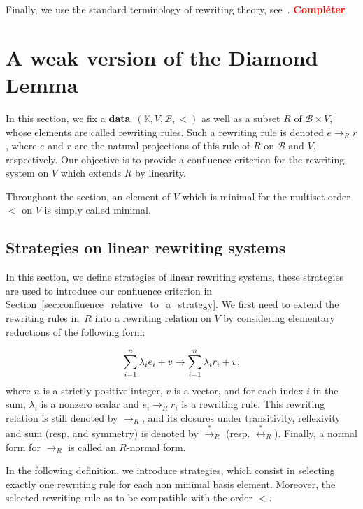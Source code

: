 \documentclass[10pt]{easychair}
\theoremstyle{definition}
\newcommand\todo[1]{{\bf\textcolor{red}{#1}}}
\newcommand\data{{\color{red}\bf data}}
\newcommand\basis{\mathscr{B}}
\newcommand\K{\mathbb{K}}
\newcommand\rewR{\to_R}
\newcommand\transR{\overset{*}{\to}_R}
\newcommand\equivR{\overset{*}{\leftrightarrow}_R}
\begin{document}
Finally, we use the standard terminology of rewriting theory,
see~\cite{MR1629216}. \todo{Compléter}

\section{A weak version of the Diamond Lemma}
\label{sec:a_weak_version_of_the_Diamond_Lemma}

In this section, we fix a \data\ $(\K,V,\basis,<)$ as well as a subset
$R$ of $\basis\times V$, whose elements are called rewriting rules. Such
a rewriting rule is denoted $e\rewR r$, where $e$ and $r$ are the natural
projections of this rule of $R$ on $\basis$ and $V$, respectively. Our
objective is to provide a confluence criterion for the rewriting system
on $V$ which extends $R$ by linearity.
\medskip

Throughout the section, an element of $V$ which is minimal for the
multiset order~$<$ on $V$ is simply called minimal.

\subsection{Strategies on linear rewriting systems}
\label{sec:strategies_on_linear_rewriting_systems}

In this section, we define strategies of linear rewriting systems, these
strategies are used to introduce our confluence criterion in
Section~\ref{sec:confluence_relative_to_a_strategy}. We first need to
extend the rewriting rules in~$R$ into a rewriting relation on $V$ by
considering elementary reductions of the following form:

\begin{equation}\label{equ:rewriting_step}
  \sum_{i=1}^n\lambda_ie_i+v\to\sum_{i=1}^n\lambda_ir_i+v,
  \smallskip
\end{equation}
where $n$ is a strictly positive integer, $v$ is a vector, and for each
index $i$ in the sum, $\lambda_i$ is a nonzero scalar and $e_i\rewR r_i$
is a rewriting rule. This rewriting relation is still denoted by $\rewR$,
and its closures under transitivity, reflexivity and sum (resp. and
symmetry) is denoted by $\transR$ (resp. $\equivR$). Finally, a normal
form for $\rewR$ is called an $R$-normal form.
\medskip

In the following definition, we introduce strategies, which consist in
selecting exactly one rewriting rule for each non minimal basis element.
Moreover, the selected rewriting rule as to be compatible with the order
$<$.
\smallskip
\end{document}
